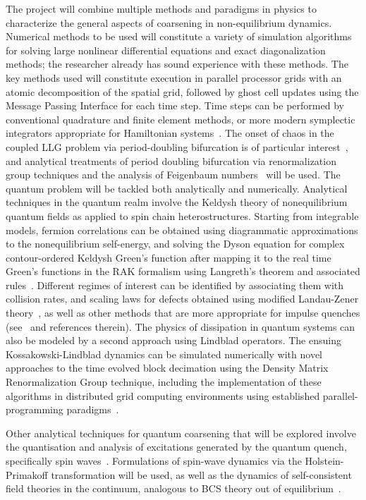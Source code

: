 \documentclass[a4paper,11pt,color]{article}
\begin{document}
\begin{enumerate}[label=(\alph*)]
The project will combine  multiple methods and paradigms in physics to characterize the general aspects of coarsening in non-equilibrium dynamics. Numerical methods to be used will constitute a variety of simulation algorithms for solving  large nonlinear differential equations and exact diagonalization methods; the researcher already has sound experience with these methods. The key methods used will constitute execution in parallel processor grids with an atomic decomposition of the spatial grid, followed by ghost cell updates using the Message Passing Interface for each time step. Time steps can be performed by conventional quadrature and finite element methods, or more modern symplectic integrators appropriate for Hamiltonian systems~\cite{symplectic}.   {The onset of chaos in the coupled LLG problem via period-doubling bifurcation is of particular interest}~\cite{gll:review}, and analytical treatments of period doubling bifurcation via renormalization group techniques and the analysis of Feigenbaum numbers~\cite{hilborn} will be used. The quantum problem will be tackled both analytically and numerically. Analytical techniques in the quantum realm involve the Keldysh theory of nonequilibrium quantum fields as applied to spin chain heterostructures. Starting from integrable models, fermion correlations can be obtained using diagrammatic approximations to the nonequilibrium self-energy, and solving the Dyson equation for complex contour-ordered Keldysh Green's function after mapping it to the real time Green's functions in the RAK formalism using Langreth's theorem and associated rules~\cite{rammer, arrachea}. Different regimes of interest can be identified by associating them with collision rates, and scaling laws for defects obtained  using modified Landau-Zener theory~\cite{fermidyn}, as well as other methods that are more appropriate for 
impulse quenches (see~\cite{ncnsd2012} and references therein). The physics of dissipation in quantum systems can also be modeled by a second approach using Lindblad operators. The ensuing Kossakowski-Lindblad dynamics  can be simulated numerically with novel approaches to the time evolved block decimation using the Density Matrix Renormalization Group technique, including the implementation of these algorithms in distributed grid computing environments using established parallel-programming paradigms~\cite{white:pdmrg}. 

Other analytical techniques for quantum coarsening that will be explored involve the quantisation and analysis of excitations generated by the quantum quench, specifically spin waves~\cite{silva1}. Formulations of spin-wave dynamics via the Holstein-Primakoff transformation will be used, as well as the dynamics of self-consistent field theories in the continuum, analogous to BCS theory out of equilibrium~\cite{gambassi,gambassi:on,silva2}.


\end{enumerate}
\end{document}

